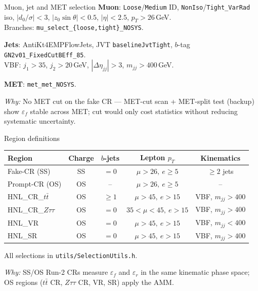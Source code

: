 \documentclass[10pt,aspectratio=169]{beamer}
\newcommand{\motiv}[1]{%
  \begin{tcolorbox}[colback=motivbg,colframe=motivbord,arc=1.5mm,boxrule=0.5pt,
                    left=1mm,right=1mm,top=0.5mm,bottom=0.5mm]
  \footnotesize\textit{Why:} #1
  \end{tcolorbox}}
\newcommand{\fname}[1]{\texttt{\tiny #1}}
\begin{document}
\begin{frame}{Muon, jet and MET selection}
  \scriptsize
  \textbf{Muon}: \texttt{Loose}/\texttt{Medium} ID, \texttt{NonIso}/\texttt{Tight\_VarRad} iso,
  $|d_0/\sigma|<3$, $|z_0\sin\theta|<0.5$, $|\eta|<2.5$, $p_T>26$\,GeV.\\
  Branches: \fname{mu\_select\_\{loose,tight\}\_NOSYS}.

  \vspace{1mm}
  \textbf{Jets}: AntiKt4EMPFlowJets, JVT \texttt{baselineJvtTight},
  $b$-tag \fname{GN2v01\_FixedCutBEff\_85}.\\
  VBF: $j_1>35$, $j_2>20$\,GeV, $|\Delta\eta_{jj}|>3$, $m_{jj}>400$\,GeV.

  \vspace{1mm}
  \textbf{MET}: \fname{met\_met\_NOSYS}.

  \motiv{No MET cut on the fake CR — MET-cut scan + MET-split test (backup)
  show $\varepsilon_f$ stable across MET; cut would only cost statistics
  without reducing systematic uncertainty.}
\end{frame}

\begin{frame}{Region definitions}
  \scriptsize
  \begin{tabular}{lcccc}
    \toprule
    Region & Charge & $b$-jets & Lepton $p_T$ & Kinematics \\
    \midrule
    Fake-CR (SS)         & SS & $=0$ & $\mu>26,\ e\geq 5$ & $\geq 2$ jets \\
    Prompt-CR (OS)       & OS & --   & $\mu>26,\ e\geq 5$ & --   \\
    HNL\_CR\_$t\bar t$   & OS & $\geq 1$ & $\mu>45,\ e>15$ & VBF, $m_{jj}>400$ \\
    HNL\_CR\_$Z\tau\tau$ & OS & $=0$ & $35<\mu<45,\ e>15$ & VBF, $m_{jj}>400$ \\
    HNL\_VR              & OS & $=0$ & $\mu>45,\ e>15$ & VBF, $m_{jj}<400$ \\
    HNL\_SR              & OS & $=0$ & $\mu>45,\ e>15$ & VBF, $m_{jj}>400$ \\
    \bottomrule
  \end{tabular}
  All selections in \fname{utils/SelectionUtils.h}.
  \motiv{SS/OS Run-2 CRs measure $\varepsilon_f$ and $\varepsilon_r$ in the same
  kinematic phase space; OS regions ($t\bar t$ CR, $Z\tau\tau$ CR, VR, SR)
  apply the AMM.}
\end{frame}
\end{document}
